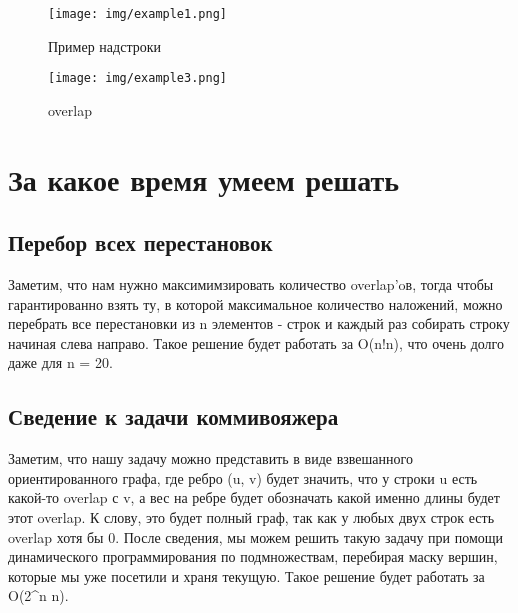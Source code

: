 \documentclass{article}
\begin{document}
\begin{figure}[htbp]
    \center
    \texttt{[image: img/example1.png]}
    \caption{Пример надстроки}
\end{figure}
\begin{figure}[htbp]
    \center
    \texttt{[image: img/example3.png]}
    \caption{overlap}
\end{figure}


\newpage
\section{За какое время умеем решать}
\subsection{Перебор всех перестановок}
Заметим, что нам нужно максимимзировать количество {overlap}'oв, тогда чтобы гарантированно взять ту, в которой максимальное количество наложений, можно перебрать все перестановки из {n} элементов - строк и каждый раз собирать строку начиная слева направо. \newline
Такое решение будет работать за {O(n!n)}, что очень долго даже для n = 20. 

\subsection{Сведение к задачи коммивояжера}
Заметим, что нашу задачу можно представить в виде взвешанного ориентированного графа, где ребро {(u, v)} будет значить, что у строки {u} есть какой-то {overlap} с {v}, а вес на ребре будет обозначать какой именно длины будет этот {overlap}. К слову, это будет полный граф, так как у любых двух строк есть {overlap} хотя бы 0. \newline
После сведения, мы можем решить такую задачу при помощи динамического программирования по подмножествам, перебирая маску вершин, которые мы уже посетили и храня текущую.
\newline
Такое решение будет работать за {O(2^n n)}.
\end{document}
